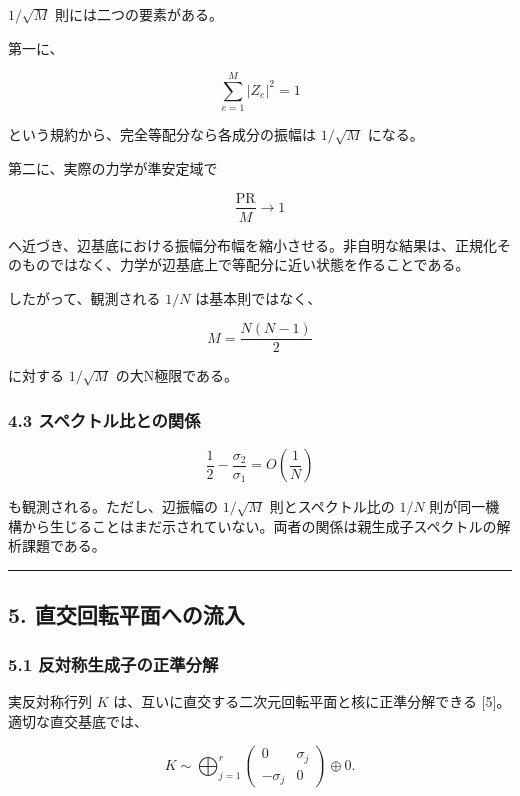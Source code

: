 \documentclass[
  a4paper,
]{ltjsarticle}
\begin{document}
\(1/\sqrt M\) 則には二つの要素がある。

第一に、

\[
\sum_{e=1}^{M}|Z_e|^2=1
\]

という規約から、完全等配分なら各成分の振幅は \(1/\sqrt M\) になる。

第二に、実際の力学が準安定域で

\[
\frac{\mathrm{PR}}{M}\to1
\]

へ近づき、辺基底における振幅分布幅を縮小させる。非自明な結果は、正規化そのものではなく、力学が辺基底上で等配分に近い状態を作ることである。

したがって、観測される \(1/N\) は基本則ではなく、

\[
M=\frac{N(N-1)}2
\]

に対する \(1/\sqrt M\) の大N極限である。

\subsubsection{4.3
スペクトル比との関係}\label{ux30b9ux30daux30afux30c8ux30ebux6bd4ux3068ux306eux95a2ux4fc2}

\[
\frac12-\frac{\sigma_2}{\sigma_1}=O\left(\frac1N\right)
\]

も観測される。ただし、辺振幅の \(1/\sqrt M\) 則とスペクトル比の \(1/N\)
則が同一機構から生じることはまだ示されていない。両者の関係は親生成子スペクトルの解析課題である。

\begin{center}\rule{0.5\linewidth}{0.5pt}\end{center}

\subsection{5.
直交回転平面への流入}\label{ux76f4ux4ea4ux56deux8ee2ux5e73ux9762ux3078ux306eux6d41ux5165}

\subsubsection{5.1
反対称生成子の正準分解}\label{ux53cdux5bfeux79f0ux751fux6210ux5b50ux306eux6b63ux6e96ux5206ux89e3}

実反対称行列 \(K\) は、互いに直交する二次元回転平面と核に正準分解できる
{[}5{]}。適切な直交基底では、

\[
K
\sim
\bigoplus_{j=1}^{r}
\begin{pmatrix}
0 & \sigma_j\\
-\sigma_j & 0
\end{pmatrix}
\oplus 0.
\]
\end{document}
